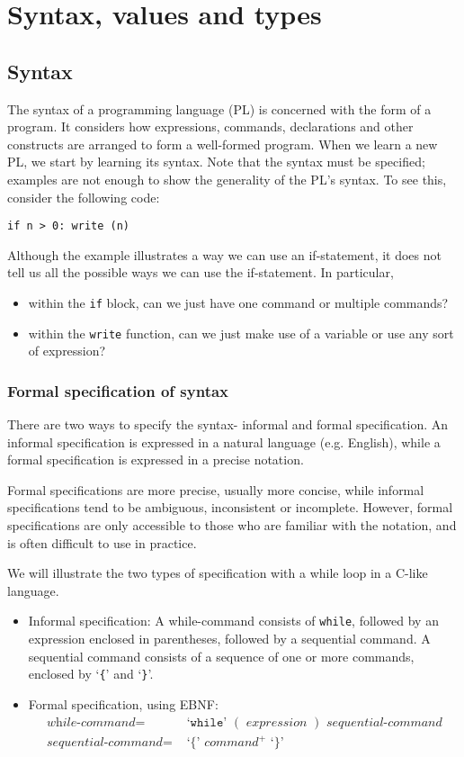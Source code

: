 \documentclass[a4paper, openany]{memoir}
\begin{document}
\chapter{Syntax, values and types}
\section{Syntax}
The syntax of a programming language (PL) is concerned with the form of a program. It considers how expressions, commands, declarations and other constructs are arranged to form a well-formed program. When we learn a new PL, we start by learning its syntax. Note that the syntax must be specified; examples are not enough to show the generality of the PL's syntax. To see this, consider the following code:
\begin{verbatim}
if n > 0: write (n)
\end{verbatim}
Although the example illustrates a way we can use an if-statement, it does not tell us all the possible ways we can use the if-statement. In particular,
\begin{itemize}
    \item within the \texttt{if} block, can we just have one command or multiple commands?
    \item within the \texttt{write} function, can we just make use of a variable or use any sort of expression?
\end{itemize}

\subsection{Formal specification of syntax}
There are two ways to specify the syntax- informal and formal specification. An informal specification is expressed in a natural language (e.g. English), while a formal specification is expressed in a precise notation. 

Formal specifications are more precise, usually more concise, while informal specifications tend to be ambiguous, inconsistent or incomplete. However, formal specifications are only accessible to those who are familiar with the notation, and is often difficult to use in practice.

We will illustrate the two types of specification with a while loop in a C-like language.
\begin{itemize}
    \item Informal specification: A while-command consists of \texttt{while}, followed by an expression enclosed in parentheses, followed by a sequential command. A sequential command consists of a sequence of one or more commands, enclosed by `\texttt{\{}' and `\texttt{\}}'.
    \item Formal specification, using EBNF:
    \begin{align*}
        \textit{while-command} =& \text{ `}\texttt{while}\text{' }  ( \textit{ expression } )  \textit{ sequential-command} \\
        \textit{sequential-command} =&  \text{ `}\texttt{\{}\text{' } \textit{command}^+ \text{ `}\texttt{\}}\text{'}
    \end{align*}
\end{itemize}
\end{document}
